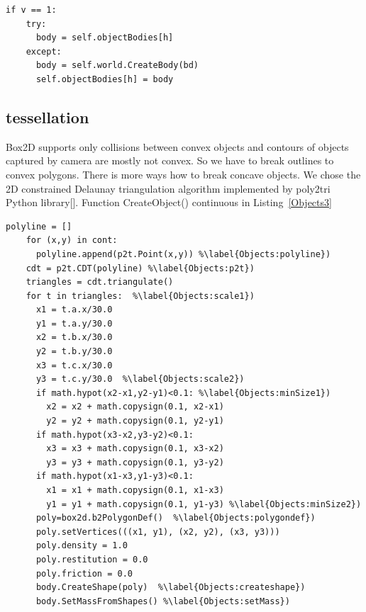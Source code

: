 \documentclass{ifacconf}
\begin{document}
\begin{lstlisting}[name=Objects,firstnumber=auto,label=Objects2,caption=Creation of objects]
if v == 1:
    try:
      body = self.objectBodies[h]
    except:
      body = self.world.CreateBody(bd)
      self.objectBodies[h] = body
\end{lstlisting}

\subsection{tessellation}
Box2D supports only collisions between convex objects and contours of objects
captured by camera are mostly not convex. So we have to break outlines to
convex polygons. There is more ways how to break concave objects. We chose the
2D constrained Delaunay triangulation algorithm implemented by poly2tri Python
library[\cite{Delauanay}]. Function CreateObject() continuous in
Listing~\ref{Objects3}

\begin{lstlisting}[name=Objects,firstnumber=auto,label=Objects3,caption=Creation of objects]
    polyline = []
    for (x,y) in cont:
      polyline.append(p2t.Point(x,y)) %\label{Objects:polyline})
    cdt = p2t.CDT(polyline) %\label{Objects:p2t})
    triangles = cdt.triangulate()
    for t in triangles:  %\label{Objects:scale1})
      x1 = t.a.x/30.0
      y1 = t.a.y/30.0
      x2 = t.b.x/30.0
      y2 = t.b.y/30.0
      x3 = t.c.x/30.0
      y3 = t.c.y/30.0  %\label{Objects:scale2})
      if math.hypot(x2-x1,y2-y1)<0.1: %\label{Objects:minSize1})
        x2 = x2 + math.copysign(0.1, x2-x1)
        y2 = y2 + math.copysign(0.1, y2-y1)
      if math.hypot(x3-x2,y3-y2)<0.1:
        x3 = x3 + math.copysign(0.1, x3-x2)
        y3 = y3 + math.copysign(0.1, y3-y2)
      if math.hypot(x1-x3,y1-y3)<0.1:
        x1 = x1 + math.copysign(0.1, x1-x3)
        y1 = y1 + math.copysign(0.1, y1-y3) %\label{Objects:minSize2})
      poly=box2d.b2PolygonDef()  %\label{Objects:polygondef})
      poly.setVertices(((x1, y1), (x2, y2), (x3, y3)))
      poly.density = 1.0
      poly.restitution = 0.0
      poly.friction = 0.0
      body.CreateShape(poly)  %\label{Objects:createshape})
      body.SetMassFromShapes() %\label{Objects:setMass})
\end{lstlisting}
\end{document}
